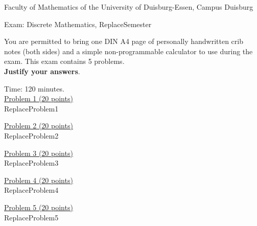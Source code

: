 \documentclass{article}
\begin{document}
Faculty of Mathematics of the University of Duisburg-Essen, Campus Duisburg\\

\begin{center}
\huge{
Exam: Discrete Mathematics, ReplaceSemester} \\[2em]                                       \end{center}
\large
You are permitted to bring one DIN A4 page of personally handwritten crib notes (both sides) and a simple non-programmable calculator to use during the exam. This exam contains 5 problems.\\
\textbf{Justify your answers}. 

Time: 120 minutes.\\[2em]   

\underline{Problem 1 (20 points)}\\[1em]
ReplaceProblem1


\vspace{2em}

\underline{Problem 2 (20 points)}\\[1em]
ReplaceProblem2

 
\vspace{2em}



\underline{Problem 3 (20 points)}\\[1em]
 ReplaceProblem3

\vspace{2em}

\underline{Problem 4 (20 points)}\\[1em]
ReplaceProblem4


\vspace{2em}

\underline{Problem 5 (20 points)}\\[1em]
ReplaceProblem5
 
\end{document}
